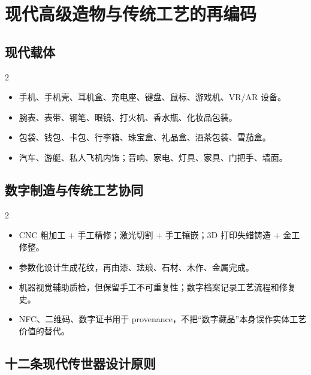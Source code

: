 \documentclass[lang=en,a4paper,11pt]{elegantpaper}
\begin{document}
\section{现代高级造物与传统工艺的再编码}


\subsection{现代载体}


\begin{multicols}{2}
\begin{itemize}
\item 手机、手机壳、耳机盒、充电座、键盘、鼠标、游戏机、VR/AR 设备。
\item 腕表、表带、钢笔、眼镜、打火机、香水瓶、化妆品包装。
\item 包袋、钱包、卡包、行李箱、珠宝盒、礼品盒、酒茶包装、雪茄盒。
\item 汽车、游艇、私人飞机内饰；音响、家电、灯具、家具、门把手、墙面。
\end{itemize}
\end{multicols}

\subsection{数字制造与传统工艺协同}


\begin{multicols}{2}
\begin{itemize}
\item CNC 粗加工 + 手工精修；激光切割 + 手工镶嵌；3D 打印失蜡铸造 + 金工修整。
\item 参数化设计生成花纹，再由漆、珐琅、石材、木作、金属完成。
\item 机器视觉辅助质检，但保留手工不可重复性；数字档案记录工艺流程和修复史。
\item NFC、二维码、数字证书用于 provenance，不把“数字藏品”本身误作实体工艺价值的替代。
\end{itemize}
\end{multicols}

\subsection{十二条现代传世器设计原则}
\end{document}
